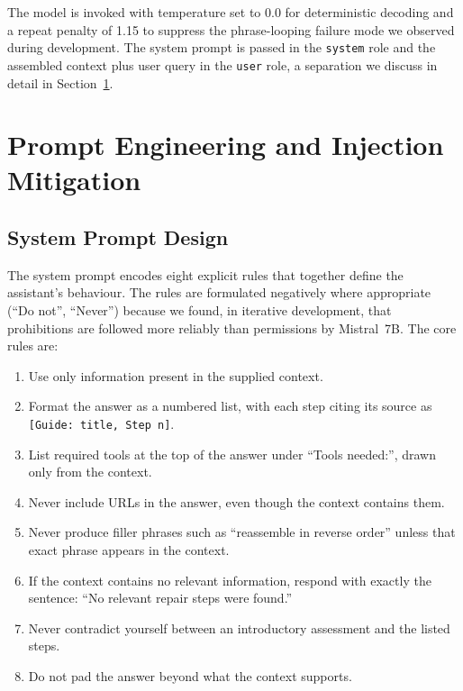 \documentclass[journal,onecolumn]{IEEEtran}
\begin{document}
The model is invoked with temperature set to 0.0 for deterministic decoding
and a repeat penalty of 1.15 to suppress the phrase-looping failure mode we
observed during development. The system prompt is passed in the \texttt{system}
role and the assembled context plus user query in the \texttt{user} role, a
separation we discuss in detail in Section~\ref{sec:prompt}.

\section{Prompt Engineering and Injection Mitigation}
\label{sec:prompt}

\subsection{System Prompt Design}

The system prompt encodes eight explicit rules that together define the
assistant's behaviour. The rules are formulated negatively where appropriate
(``Do not'', ``Never'') because we found, in iterative development, that
prohibitions are followed more reliably than permissions by Mistral~7B. The
core rules are:

\begin{enumerate}
    \item Use only information present in the supplied context.
    \item Format the answer as a numbered list, with each step citing its
          source as \texttt{[Guide: title, Step n]}.
    \item List required tools at the top of the answer under
          ``Tools needed:'', drawn only from the context.
    \item Never include URLs in the answer, even though the context contains
          them.
    \item Never produce filler phrases such as ``reassemble in reverse
          order'' unless that exact phrase appears in the context.
    \item If the context contains no relevant information, respond with
          exactly the sentence: ``No relevant repair steps were found.''
    \item Never contradict yourself between an introductory assessment and
          the listed steps.
    \item Do not pad the answer beyond what the context supports.
\end{enumerate}
\end{document}
